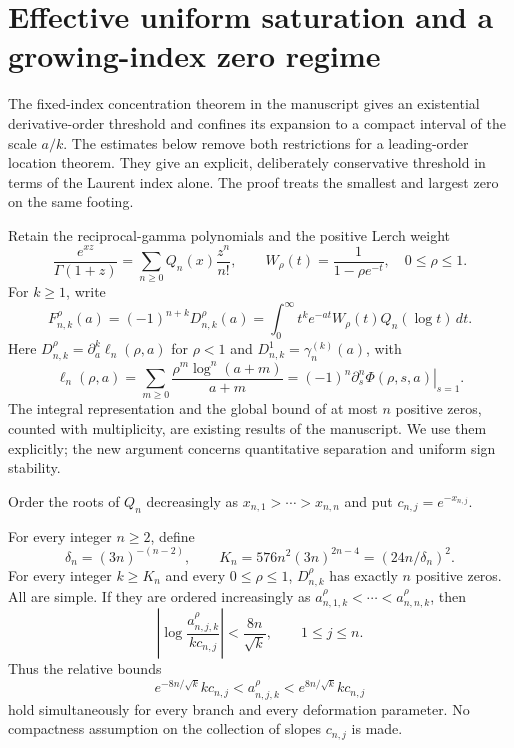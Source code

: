 \section{Effective uniform saturation and a growing-index zero regime}
\label{efflerch:sec:main}

The fixed-index concentration theorem in the manuscript gives an
existential derivative-order threshold and confines its expansion to a
compact interval of the scale $a/k$.  The estimates below remove both
restrictions for a leading-order location theorem.  They give an explicit,
deliberately conservative threshold in terms of the Laurent index alone.
The proof treats the smallest and largest zero on the same footing.

Retain the reciprocal-gamma polynomials and the positive Lerch weight
\[
 \frac{e^{xz}}{\Gamma(1+z)}
   =\sum_{n\geq0}Q_n(x)\frac{z^n}{n!},
 \qquad W_\rho(t)=\frac1{1-\rho e^{-t}},\quad 0\leq\rho\leq1.
\]
For $k\geq1$, write
\begin{equation}\label{efflerch:eq:F}
 F_{n,k}^\rho(a)=(-1)^{n+k}D_{n,k}^\rho(a)
 =\int_0^\infty t^k e^{-at}W_\rho(t)Q_n(\log t)\,dt.
\end{equation}
Here $D_{n,k}^\rho=\partial_a^k\ell_n(\rho,a)$ for $\rho<1$
and $D_{n,k}^1=\gamma_n^{(k)}(a)$, with
\[
 \ell_n(\rho,a)=\sum_{m\geq0}
       \frac{\rho^m\log^n(a+m)}{a+m}
 =(-1)^n\left.\partial_s^n\Phi(\rho,s,a)\right|_{s=1}.
\]
The integral representation and the
global bound of at most $n$ positive zeros, counted with multiplicity,
are existing results of the manuscript.  We use them explicitly;
the new argument concerns quantitative separation and uniform sign
stability.

Order the roots of $Q_n$ decreasingly as
$x_{n,1}>\cdots>x_{n,n}$ and put $c_{n,j}=e^{-x_{n,j}}$.

\begin{theorem}
\label{efflerch:thm:explicit}
For every integer $n\geq2$, define
\begin{equation}\label{efflerch:eq:Kn}
 \delta_n=(3n)^{-(n-2)},\qquad
 K_n=576n^2(3n)^{2n-4}=(24n/\delta_n)^2.
\end{equation}
For every integer $k\geq K_n$ and every $0\leq\rho\leq1$,
$D_{n,k}^\rho$ has exactly $n$ positive zeros.  All are simple.
If they are ordered increasingly as $a_{n,1,k}^\rho<\cdots<a_{n,n,k}^\rho$,
then
\begin{equation}\label{efflerch:eq:location}
 \left|\log\frac{a_{n,j,k}^\rho}{k c_{n,j}}\right|
   <\frac{8n}{\sqrt{k}},\qquad 1\leq j\leq n.
\end{equation}
Thus the relative bounds
\[
 e^{-8n/\sqrt{k}}k c_{n,j}
  <a_{n,j,k}^\rho<e^{8n/\sqrt{k}}k c_{n,j}
\]
hold simultaneously for every branch and every deformation parameter.
No compactness assumption on the collection of slopes $c_{n,j}$ is made.
\end{theorem}

